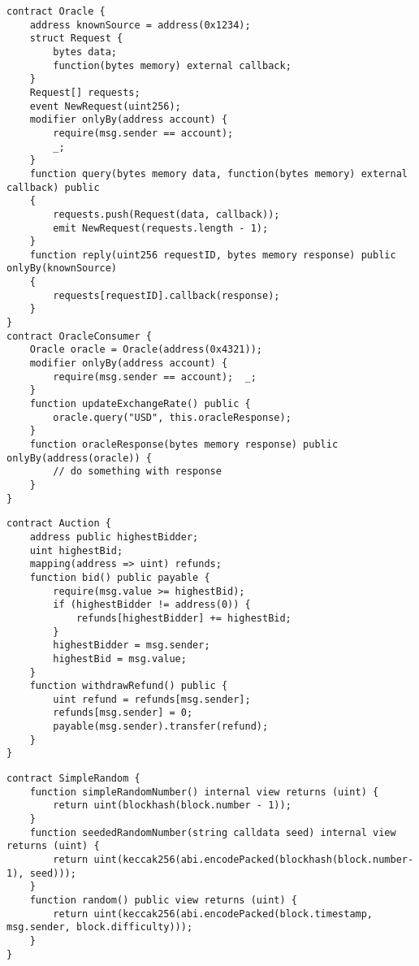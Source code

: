 {{\begin{lstlisting}[language=Solidity, caption={Codice di riferimento per Oracle}, label={appendix:oracle}]
contract Oracle {
	address knownSource = address(0x1234);
	struct Request {
		bytes data;
		function(bytes memory) external callback;
	}
	Request[] requests;
	event NewRequest(uint256);
	modifier onlyBy(address account) {
		require(msg.sender == account);
		_;
	}
	function query(bytes memory data, function(bytes memory) external callback) public
	{
		requests.push(Request(data, callback));
		emit NewRequest(requests.length - 1);
	}
	function reply(uint256 requestID, bytes memory response) public onlyBy(knownSource)
	{
		requests[requestID].callback(response);
	}
}
contract OracleConsumer {
	Oracle oracle = Oracle(address(0x4321));
	modifier onlyBy(address account) { 
		require(msg.sender == account);  _; 
	}
	function updateExchangeRate() public {
		oracle.query("USD", this.oracleResponse);
	}
	function oracleResponse(bytes memory response) public onlyBy(address(oracle)) {
		// do something with response
	}
}
\end{lstlisting}}

{\begin{lstlisting}[language=Solidity, caption={Codice di riferimento per Pull Over Push}, label={appendix:pull_over_push}]
contract Auction {
	address public highestBidder;
	uint highestBid;
	mapping(address => uint) refunds;
	function bid() public payable {
		require(msg.value >= highestBid);
		if (highestBidder != address(0)) {
			refunds[highestBidder] += highestBid; 
		}
		highestBidder = msg.sender;
		highestBid = msg.value;
	}
	function withdrawRefund() public {
		uint refund = refunds[msg.sender];
		refunds[msg.sender] = 0;
		payable(msg.sender).transfer(refund);
	}
}
\end{lstlisting}}

\newpage

{\begin{lstlisting}[language=Solidity, caption={Codice di riferimento per Randomness}, label={appendix:randomness}]
contract SimpleRandom {
	function simpleRandomNumber() internal view returns (uint) {
		return uint(blockhash(block.number - 1));
	}
	function seededRandomNumber(string calldata seed) internal view returns (uint) {
		return uint(keccak256(abi.encodePacked(blockhash(block.number-1), seed)));
	}
	function random() public view returns (uint) {
		return uint(keccak256(abi.encodePacked(block.timestamp, msg.sender, block.difficulty)));
	}
}
\end{lstlisting}}

}
